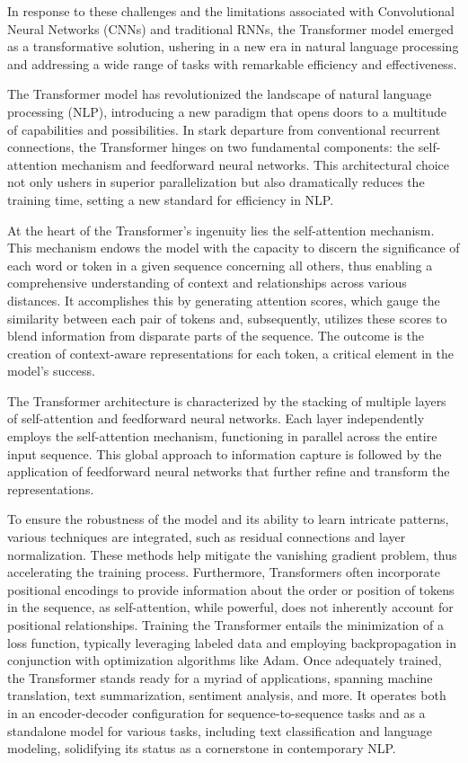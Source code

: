 \documentclass[conference]{IEEEtran}
\begin{document}
In response to these challenges and the limitations associated with Convolutional Neural Networks (CNNs) and traditional RNNs, the Transformer model emerged as a transformative solution, ushering in a new era in natural language processing and addressing a wide range of tasks with remarkable efficiency and effectiveness.

The Transformer model has revolutionized the landscape of natural language processing (NLP), introducing a new paradigm that opens doors to a multitude of capabilities and possibilities. In stark departure from conventional recurrent connections, the Transformer hinges on two fundamental components: the self-attention mechanism and feedforward neural networks. This architectural choice not only ushers in superior parallelization but also dramatically reduces the training time, setting a new standard for efficiency in NLP.


At the heart of the Transformer's ingenuity lies the self-attention mechanism. This mechanism endows the model with the capacity to discern the significance of each word or token in a given sequence concerning all others, thus enabling a comprehensive understanding of context and relationships across various distances. It accomplishes this by generating attention scores, which gauge the similarity between each pair of tokens and, subsequently, utilizes these scores to blend information from disparate parts of the sequence. The outcome is the creation of context-aware representations for each token, a critical element in the model's success.


The Transformer architecture is characterized by the stacking of multiple layers of self-attention and feedforward neural networks. Each layer independently employs the self-attention mechanism, functioning in parallel across the entire input sequence. This global approach to information capture is followed by the application of feedforward neural networks that further refine and transform the representations.


To ensure the robustness of the model and its ability to learn intricate patterns, various techniques are integrated, such as residual connections and layer normalization. These methods help mitigate the vanishing gradient problem, thus accelerating the training process. Furthermore, Transformers often incorporate positional encodings to provide information about the order or position of tokens in the sequence, as self-attention, while powerful, does not inherently account for positional relationships.
Training the Transformer entails the minimization of a loss function, typically leveraging labeled data and employing backpropagation in conjunction with optimization algorithms like Adam. Once adequately trained, the Transformer stands ready for a myriad of applications, spanning machine translation, text summarization, sentiment analysis, and more. It operates both in an encoder-decoder configuration for sequence-to-sequence tasks and as a standalone model for various tasks, including text classification and language modeling, solidifying its status as a cornerstone in contemporary NLP.
\end{document}

